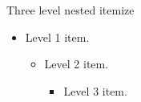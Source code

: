 \documentclass[14pt,t]{beamer}
\begin{document}
\begin{frame}{Three level nested itemize}
\begin{itemize}
\item Level 1 item.
  \begin{itemize}
  \item Level 2 item.
    \begin{itemize}
    \item Level 3 item.
    \end{itemize}
  \end{itemize}
\end{itemize}
\end{frame}
\end{document}
